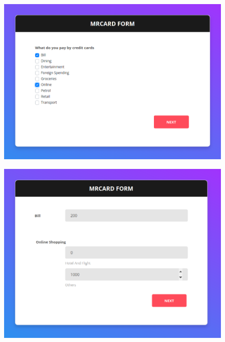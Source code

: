 		\begin{figure}[H]
			\centering
			\includegraphics[width=\linewidth]{img/scenario2_spending_checkbox.png}
		\end{figure}

		\begin{figure}[H]
			\centering
			\includegraphics[width=\linewidth]{img/scenario2_spending_amount.png}
		\end{figure}


